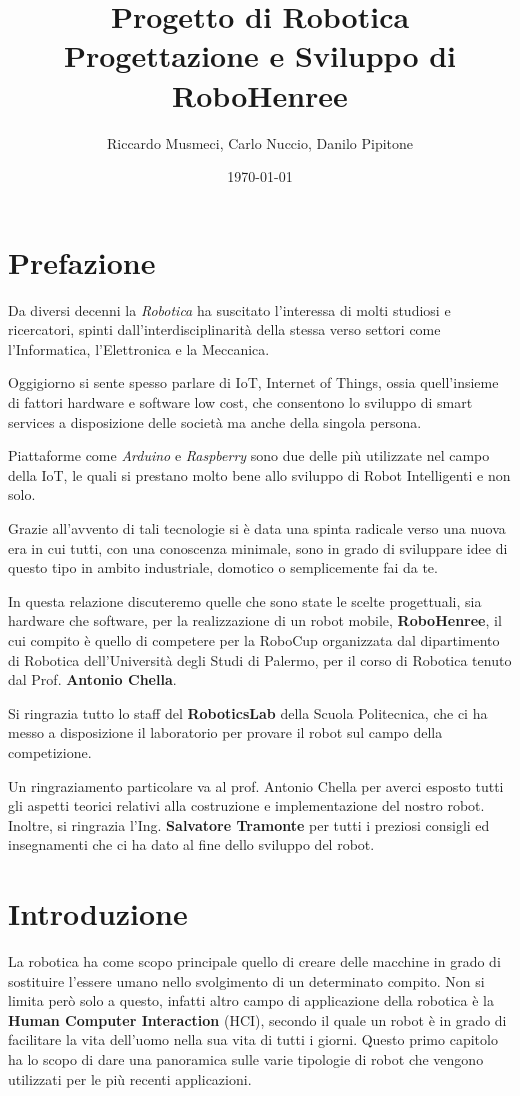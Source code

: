 \documentclass[a4paper,12pt,italian]{article}
\title{Progetto di Robotica \\ \large Progettazione e Sviluppo di RoboHenree} %
\author{Riccardo Musmeci, Carlo Nuccio, Danilo Pipitone} %
\date{\today} %
\begin{document}
\maketitle %

\tableofcontents

\pagebreak

\section{Prefazione}
Da diversi decenni la \textit{Robotica} ha suscitato l'interessa di molti studiosi e ricercatori, spinti dall'interdisciplinarità della stessa verso settori come l'Informatica, l'Elettronica e la Meccanica. 

Oggigiorno si sente spesso parlare di IoT, Internet of Things, ossia quell’insieme di fattori hardware e software low cost, che consentono lo sviluppo di smart services a disposizione delle società ma anche della singola persona. 

Piattaforme come \textit{Arduino} e \textit{Raspberry} sono due delle più utilizzate nel campo della IoT, le quali si prestano molto bene allo sviluppo di Robot Intelligenti e non solo.

Grazie all’avvento di tali tecnologie si è data una spinta radicale verso una nuova era in cui tutti, con una conoscenza minimale, sono in grado di sviluppare idee di questo tipo in ambito industriale, domotico o semplicemente fai da te.

In questa relazione discuteremo quelle che sono state le scelte progettuali, sia hardware che software, per la realizzazione di un robot mobile, \textbf{RoboHenree}, il cui compito è quello di competere per la RoboCup organizzata dal dipartimento di Robotica dell’Università degli Studi di Palermo, per il corso di Robotica tenuto dal Prof. \textbf{Antonio Chella}.

Si ringrazia tutto lo staff del \textbf{RoboticsLab} della Scuola Politecnica, che ci ha messo a disposizione il laboratorio per provare il robot sul campo della competizione. 

Un ringraziamento particolare va al prof. Antonio Chella per averci esposto tutti gli aspetti teorici relativi alla costruzione e implementazione del nostro robot.
Inoltre, si ringrazia l’Ing. \textbf{Salvatore Tramonte} per tutti i preziosi consigli ed insegnamenti che ci ha dato al fine dello sviluppo del robot.

\section{Introduzione}
La robotica ha come scopo principale quello di creare delle macchine in grado di sostituire l’essere umano nello svolgimento di un determinato compito.
Non si limita però solo a questo, infatti altro campo di applicazione della robotica è la \textbf{Human Computer Interaction} (HCI), secondo il quale un robot è in grado di facilitare la vita dell’uomo nella sua vita di tutti i giorni.
Questo primo capitolo ha lo scopo di dare una panoramica sulle varie tipologie di robot che vengono utilizzati per le più recenti applicazioni.
\end{document}
